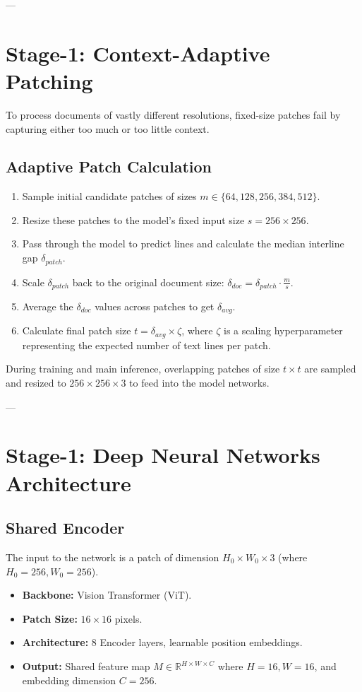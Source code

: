 \documentclass[12pt,a4paper]{article}
\begin{document}
---

\section{Stage-1: Context-Adaptive Patching}
To process documents of vastly different resolutions, fixed-size patches fail by capturing either too much or too little context. 

\subsection{Adaptive Patch Calculation}
\begin{enumerate}
    \item Sample initial candidate patches of sizes $m \in \{64, 128, 256, 384, 512\}$.
    \item Resize these patches to the model's fixed input size $s = 256 \times 256$.
    \item Pass through the model to predict lines and calculate the median interline gap $\delta_{patch}$.
    \item Scale $\delta_{patch}$ back to the original document size: $\delta_{doc} = \delta_{patch} \cdot \frac{m}{s}$.
    \item Average the $\delta_{doc}$ values across patches to get $\delta_{avg}$.
    \item Calculate final patch size $t = \delta_{avg} \times \zeta$, where $\zeta$ is a scaling hyperparameter representing the expected number of text lines per patch.
\end{enumerate}

During training and main inference, overlapping patches of size $t \times t$ are sampled and resized to $256 \times 256 \times 3$ to feed into the model networks.

---

\section{Stage-1: Deep Neural Networks Architecture}

\subsection{Shared Encoder}
The input to the network is a patch of dimension $H_0 \times W_0 \times 3$ (where $H_0=256, W_0=256$).
\begin{itemize}
    \item \textbf{Backbone:} Vision Transformer (ViT).
    \item \textbf{Patch Size:} $16 \times 16$ pixels.
    \item \textbf{Architecture:} 8 Encoder layers, learnable position embeddings.
    \item \textbf{Output:} Shared feature map $M \in \mathbb{R}^{H \times W \times C}$ where $H=16, W=16$, and embedding dimension $C=256$.
\end{itemize}
\end{document}
